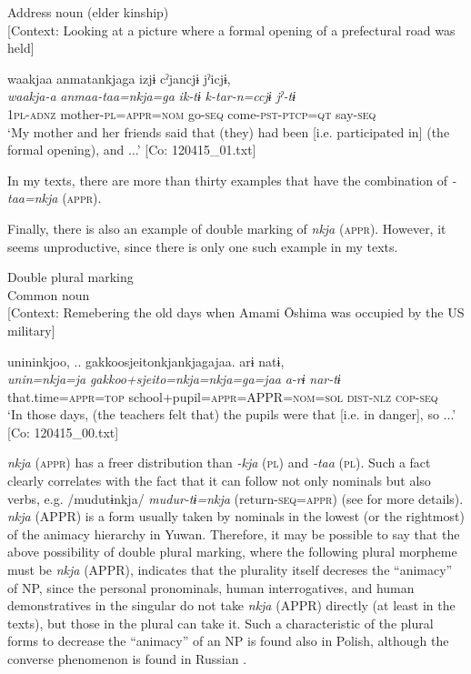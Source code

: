 \ex Address noun (elder kinship)\\{}
[Context: Looking at a picture where a formal opening of a prefectural road was held]

{\TM}
\glll waakjaa  anmatankjaga  izjɨ  cˀjancjɨ   jˀicjɨ,\\
      \textit{waakja-a}  \textit{anmaa-taa=nkja=ga}  \textit{ik-tɨ}  \textit{k-tar-n=ccjɨ}  \textit{jˀ-tɨ}\\
      1\textsc{pl}-\textsc{adnz}  mother-\textsc{pl}=\textsc{appr}=\textsc{nom}  go-\textsc{seq}  come-\textsc{pst}-\textsc{ptcp}=\textsc{qt}  say-\textsc{seq}\\
\glt ‘My mother and her friends said that (they) had been [i.e. participated in] (the formal opening), and ...’ [Co: 120415\_01.txt]
\z
\z

In my texts, there are more than thirty examples that have the combination of \textit{-taa=nkja} (\textsc{appr}).

Finally, there is also an example of double marking of \textit{nkja} (\textsc{appr}). However, it seems unproductive, since there is only one such example in my texts.

\ea\label{ex:6-104}
  Double plural marking\\{}
  Common noun\\{}
  [Context: Remebering the old days when Amami Ōshima was occupied by the US military]

{\TM}
\glll unininkjoo, ..\textsubscript{} {\textbar}gakkoosjeito{\textbar}nkjankjagajaa.    arɨ  natɨ,\\
\textit{unin}{\footnotemark}\textit{=nkja=ja}  \textit{gakkoo+sjeito=nkja=nkja=ga=jaa}    \textit{a-rɨ}  \textit{nar-tɨ}\\
    that.time=\textsc{appr}=\textsc{top}  school+pupil=\textsc{appr}=APPR=\textsc{nom}=\textsc{sol}    \textsc{dist}-\textsc{nlz}  \textsc{cop}-\textsc{seq}\\
\glt    ‘In those days, (the teachers felt that) the pupils were that [i.e. in danger], so ...’ [Co: 120415\_00.txt]
\z

\textit{nkja} (\textsc{appr}) has a freer distribution than \textit{-kja} (\textsc{pl}) and \textit{-taa} (\textsc{pl}). Such a fact clearly correlates with the fact that it can follow not only nominals but also verbs, e.g. /mudutɨnkja/ \textit{mudur-tɨ=nkja} (return-\textsc{seq}=\textsc{appr}) (see for more details). \textit{nkja} (APPR) is a form usually taken by nominals in the lowest (or the rightmost) of the animacy hierarchy in Yuwan. Therefore, it may be possible to say that the above possibility of double plural marking, where the following plural morpheme must be \textit{nkja} (APPR), indicates that the plurality itself decreses the “animacy” of NP, since the personal pronominals, human interrogatives, and human demonstratives in the singular do not take \textit{nkja} (APPR) directly (at least in the texts), but those in the plural can take it. Such a characteristic of the plural forms to decrease the “animacy” of an NP is found also in Polish, although the converse phenomenon is found in Russian \citep[188]{Comrie1989}.

